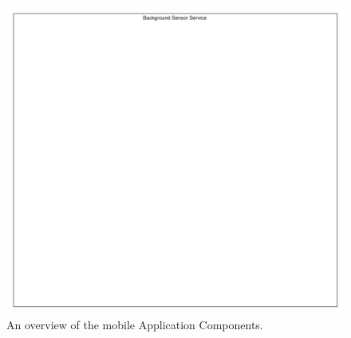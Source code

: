 \begin{figure}[!htbp]
    \centering
    \includegraphics[width=\textwidth]{graphic/backgroundsensorservice/lifecyclestuff}
    \caption{An overview of the mobile Application Components.}
    \label{fig:system_currency_and_lifecycle}
\end{figure}
\FloatBarrier
